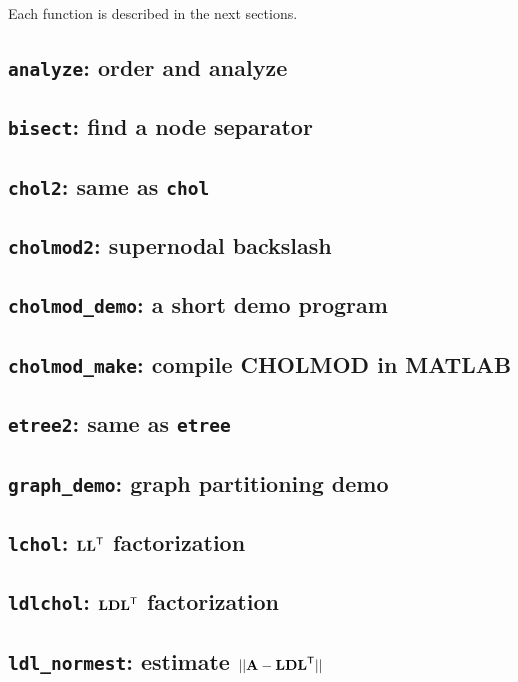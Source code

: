 \documentclass[11pt]{article}
\newcommand{\m}[1]{{\bf{#1}}}       %
\newcommand{\tr}{^{\sf T}}          %
\begin{document}
\vspace{0.1in}\noindent
Each function is described in the next sections.

\newpage
\subsection{{\tt analyze}: order and analyze}					
\subsection{{\tt bisect}: find a node separator}				
\subsection{{\tt chol2}: same as {\tt chol}}					
\newpage
\subsection{{\tt cholmod2}: supernodal backslash}				
\newpage
\subsection{{\tt cholmod\_demo}: a short demo program}				
\subsection{{\tt cholmod\_make}: compile CHOLMOD in MATLAB}			
\newpage
\subsection{{\tt etree2}: same as {\tt etree}}					
\subsection{{\tt graph\_demo}: graph partitioning demo}				
\newpage
\subsection{{\tt lchol}: $\m{LL}\tr$ factorization}				
\subsection{{\tt ldlchol}: $\m{LDL}\tr$ factorization}				
\newpage
\subsection{{\tt ldl\_normest}: estimate $||\m{A}-\m{LDL}\tr||$}		
\end{document}
